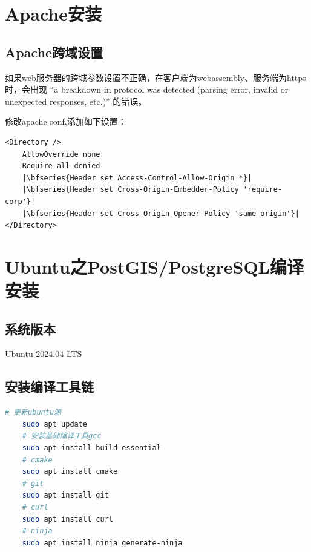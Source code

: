 \chapter{Apache安装}

\section{Apache跨域设置}

如果web服务器的跨域参数设置不正确，在客户端为webassembly、服务端为https时，会出现
“a breakdown in protocol was detected (parsing error, invalid or unexpected responses, etc.)”
的错误。

修改apache.conf,添加如下设置：
\begin{verbatim}
<Directory />
	AllowOverride none
	Require all denied
	|\bfseries{Header set Access-Control-Allow-Origin *}|
	|\bfseries{Header set Cross-Origin-Embedder-Policy 'require-corp'}|
	|\bfseries{Header set Cross-Origin-Opener-Policy 'same-origin'}|
</Directory>
\end{verbatim}


\chapter{Ubuntu之PostGIS/PostgreSQL编译安装}

\section{系统版本}
Ubuntu 2024.04 LTS

\section{安装编译工具链}
\begin{lstlisting}[backgroundcolor = \color{codebackground}, language=bash]
	# 更新ubuntu源
	sudo apt update
	# 安装基础编译工具gcc
	sudo apt install build-essential 
	# cmake
	sudo apt install cmake 
	# git
	sudo apt install git
	# curl 
	sudo apt install curl 
	# ninja
	sudo apt install ninja generate-ninja
\end{lstlisting}


